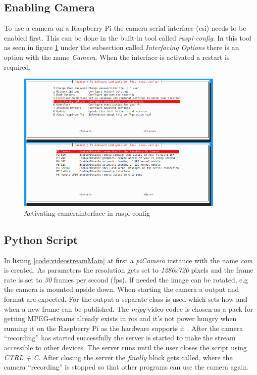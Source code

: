 \subsection{Enabling Camera}
To use a camera on a Raspberry Pi the camera serial interface (\gls{csi}) needs to be enabled first. This can be done in the built-in tool called \textit{raspi-config}. In this tool as seen in figure \ref{img:raspiconfig} under the subsection called \textit{Interfacing Options} there is an option with the name \textit{Camera}. When the interface is activated a restart is required.\newline
\begin{figure}[h]
	\centering
	\includegraphics[width=0.9\textwidth]{./media/images/raspiconfig.png}
  	\caption{Activating camerainterface in raspi-config}
  	\label{img:raspiconfig}
\end{figure}

\subsection{Python Script}\label{ref:streamPythonScript}
In listing \ref{code:videostreamMain} at first a \textit{piCamera} instance with the name \textit{cam} is created. As parameters the resolution gets set to \textit{1280x720} pixels and the frame rate is set to \textit{30} frames per second (\gls{fps}). If needed the image can be rotated, e.g the camera is mounted upside down. When starting the camera a output and format are expected. For the output a separate class is used which sets how and when a new frame can be published. The \textit{mjpg} video codec is chosen as a pack for getting MPEG-streams already exists in \gls{ros} and it's not power hungry when running it on the Raspberry Pi as the hardware supports it \cite{raspberrypi3bplusspecs}. \newline
After the camera \enquote{recording} has started successfully the server is started to make the stream accessible to other devices. The server runs until the user closes the script using \textit{CTRL + C}. After closing the server the \textit{finally} block gets called, where the camera \enquote{recording} is stopped so that other programs can use the camera again.\newline


